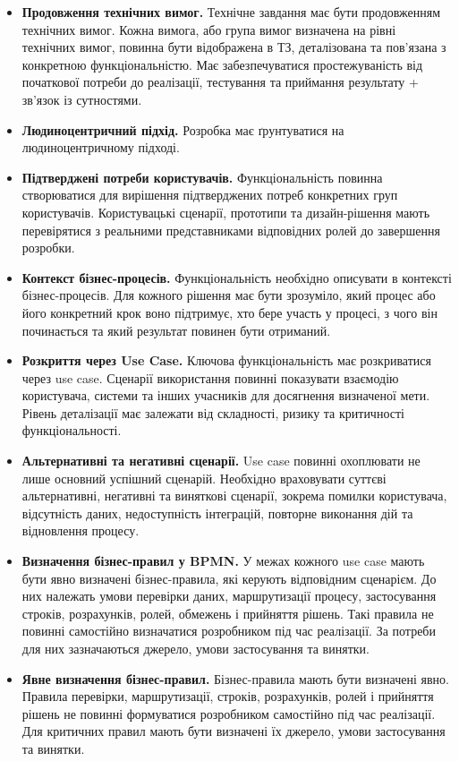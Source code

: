 \documentclass{article}
\begin{document}
\begin{itemize}
    \item \textbf{Продовження технічних вимог.} Технічне завдання має бути продовженням технічних вимог. Кожна вимога, або група вимог визначена на рівні технічних вимог, повинна бути відображена в ТЗ, деталізована та пов’язана з конкретною функціональністю. Має забезпечуватися простежуваність від початкової потреби до реалізації, тестування та приймання результату + зв’язок із сутностями.
    \item \textbf{Людиноцентричний підхід.} Розробка має ґрунтуватися на людиноцентричному підході.
    \item \textbf{Підтверджені потреби користувачів.} Функціональність повинна створюватися для вирішення підтверджених потреб конкретних груп користувачів. Користувацькі сценарії, прототипи та дизайн-рішення мають перевірятися з реальними представниками відповідних ролей до завершення розробки.
    \item \textbf{Контекст бізнес-процесів.} Функціональність необхідно описувати в контексті бізнес-процесів. Для кожного рішення має бути зрозуміло, який процес або його конкретний крок воно підтримує, хто бере участь у процесі, з чого він починається та який результат повинен бути отриманий.
    \item \textbf{Розкриття через Use Case.} Ключова функціональність має розкриватися через use case. Сценарії використання повинні показувати взаємодію користувача, системи та інших учасників для досягнення визначеної мети. Рівень деталізації має залежати від складності, ризику та критичності функціональності.
    \item \textbf{Альтернативні та негативні сценарії.} Use case повинні охоплювати не лише основний успішний сценарій. Необхідно враховувати суттєві альтернативні, негативні та виняткові сценарії, зокрема помилки користувача, відсутність даних, недоступність інтеграцій, повторне виконання дій та відновлення процесу.
    \item \textbf{Визначення бізнес-правил у BPMN.} У межах кожного use case мають бути явно визначені бізнес-правила, які керують відповідним сценарієм. До них належать умови перевірки даних, маршрутизації процесу, застосування строків, розрахунків, ролей, обмежень і прийняття рішень. Такі правила не повинні самостійно визначатися розробником під час реалізації. За потреби для них зазначаються джерело, умови застосування та винятки.
    \item \textbf{Явне визначення бізнес-правил.} Бізнес-правила мають бути визначені явно. Правила перевірки, маршрутизації, строків, розрахунків, ролей і прийняття рішень не повинні формуватися розробником самостійно під час реалізації. Для критичних правил мають бути визначені їх джерело, умови застосування та винятки.

\end{itemize}
\end{document}
